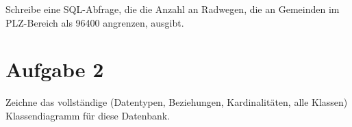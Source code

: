 \vspace{0.3cm}

Schreibe eine SQL-Abfrage, die die Anzahl an Radwegen, die an Gemeinden im PLZ-Bereich  als 96400 angrenzen, ausgibt.





\begin{minipage}[t]{\textwidth}
\section*{Aufgabe 2}

Zeichne das vollständige (Datentypen, Beziehungen, Kardinalitäten, alle Klassen) Klassendiagramm für diese Datenbank.


\end{minipage}